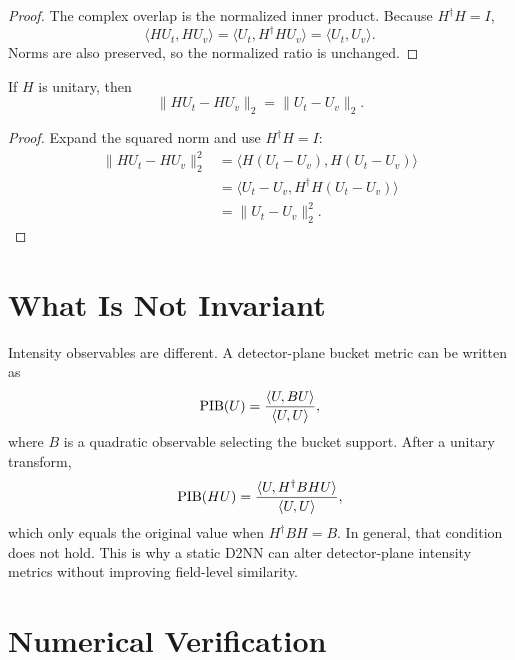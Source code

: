 \begin{proof}
The complex overlap is the normalized inner product. Because $H^\dagger H = I$,
\begin{equation}
\langle HU_t, HU_v \rangle = \langle U_t, H^\dagger H U_v \rangle
= \langle U_t, U_v \rangle.
\end{equation}
Norms are also preserved, so the normalized ratio is unchanged.
\end{proof}

\begin{theorem}
If $H$ is unitary, then
\begin{equation}
\|HU_t - HU_v\|_2 = \|U_t - U_v\|_2.
\end{equation}
\end{theorem}

\begin{proof}
Expand the squared norm and use $H^\dagger H = I$:
\begin{align}
\|HU_t - HU_v\|_2^2
&= \langle H(U_t-U_v), H(U_t-U_v) \rangle \\
&= \langle U_t-U_v, H^\dagger H (U_t-U_v) \rangle \\
&= \|U_t-U_v\|_2^2.
\end{align}
\end{proof}

\section{What Is Not Invariant}

Intensity observables are different. A detector-plane bucket metric can be
written as
\begin{equation}
\mathrm{PIB}(U) = \frac{\langle U, B U \rangle}{\langle U, U \rangle},
\end{equation}
where $B$ is a quadratic observable selecting the bucket support. After a
unitary transform,
\begin{equation}
\mathrm{PIB}(HU) = \frac{\langle U, H^\dagger B H U \rangle}{\langle U, U \rangle},
\end{equation}
which only equals the original value when $H^\dagger B H = B$. In general, that
condition does not hold. This is why a static D2NN can alter detector-plane
intensity metrics without improving field-level similarity.

\section{Numerical Verification}

